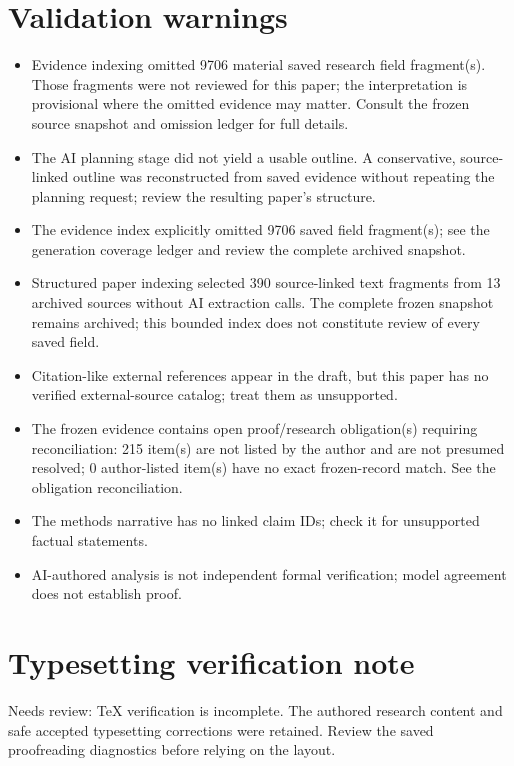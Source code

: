 \documentclass[11pt]{article}
\begin{document}
\section*{Validation warnings}
\begin{itemize}
\item Evidence indexing omitted 9706 material saved research field fragment(s). Those fragments were not reviewed for this paper; the interpretation is provisional where the omitted evidence may matter. Consult the frozen source snapshot and omission ledger for full details.
\item The AI planning stage did not yield a usable outline. A conservative, source-linked outline was reconstructed from saved evidence without repeating the planning request; review the resulting paper's structure.
\item The evidence index explicitly omitted 9706 saved field fragment(s); see the generation coverage ledger and review the complete archived snapshot.
\item Structured paper indexing selected 390 source-linked text fragments from 13 archived sources without AI extraction calls. The complete frozen snapshot remains archived; this bounded index does not constitute review of every saved field.
\item Citation-like external references appear in the draft, but this paper has no verified external-source catalog; treat them as unsupported.
\item The frozen evidence contains open proof/research obligation(s) requiring reconciliation: 215 item(s) are not listed by the author and are not presumed resolved; 0 author-listed item(s) have no exact frozen-record match. See the obligation reconciliation.
\item The methods narrative has no linked claim IDs; check it for unsupported factual statements.
\item AI-authored analysis is not independent formal verification; model agreement does not establish proof.
\end{itemize}
\section*{Typesetting verification note}
Needs review: TeX verification is incomplete. The authored research content and safe accepted typesetting corrections were retained. Review the saved proofreading diagnostics before relying on the layout.
\end{document}
